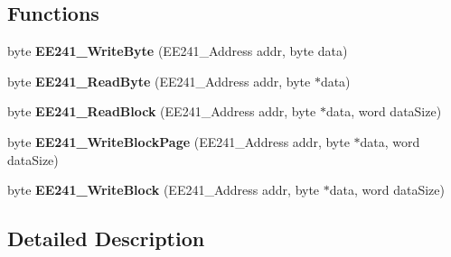 \subsection*{Functions}
\begin{DoxyCompactItemize}
\item 
\hypertarget{group___e_e241__module_ga1070e81c28997395bd8de6a0a8b995be}{byte {\bfseries E\-E241\-\_\-\-Write\-Byte} (E\-E241\-\_\-\-Address addr, byte data)}\label{group___e_e241__module_ga1070e81c28997395bd8de6a0a8b995be}

\item 
\hypertarget{group___e_e241__module_ga982afa9536b10db5a0764a56502e8f9c}{byte {\bfseries E\-E241\-\_\-\-Read\-Byte} (E\-E241\-\_\-\-Address addr, byte $\ast$data)}\label{group___e_e241__module_ga982afa9536b10db5a0764a56502e8f9c}

\item 
\hypertarget{group___e_e241__module_ga80792b51a53bbd97de7dbcd3ff9d86cd}{byte {\bfseries E\-E241\-\_\-\-Read\-Block} (E\-E241\-\_\-\-Address addr, byte $\ast$data, word data\-Size)}\label{group___e_e241__module_ga80792b51a53bbd97de7dbcd3ff9d86cd}

\item 
\hypertarget{group___e_e241__module_ga5d97e5f8f3f54b1bfa4ae79ca4fd87c2}{byte {\bfseries E\-E241\-\_\-\-Write\-Block\-Page} (E\-E241\-\_\-\-Address addr, byte $\ast$data, word data\-Size)}\label{group___e_e241__module_ga5d97e5f8f3f54b1bfa4ae79ca4fd87c2}

\item 
\hypertarget{group___e_e241__module_gac6f295c10b0784f21e97ae7456835787}{byte {\bfseries E\-E241\-\_\-\-Write\-Block} (E\-E241\-\_\-\-Address addr, byte $\ast$data, word data\-Size)}\label{group___e_e241__module_gac6f295c10b0784f21e97ae7456835787}

\end{DoxyCompactItemize}


\subsection{Detailed Description}
